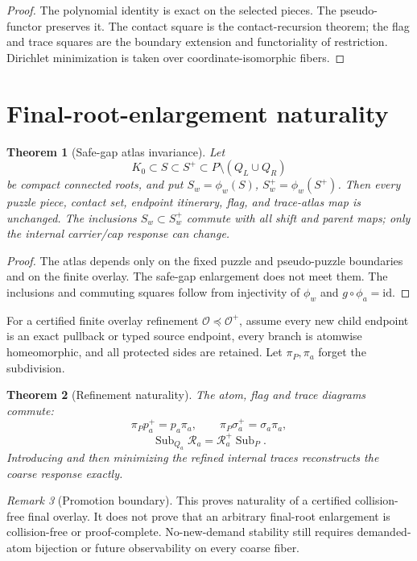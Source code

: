 \documentclass[11pt]{article}
\newtheorem{theorem}{Theorem}[section]
\theoremstyle{definition}
\theoremstyle{remark}
\newtheorem{remark}[theorem]{Remark}
\begin{document}
\begin{proof}
The polynomial identity is exact on the selected pieces.  The pseudo-functor
preserves it.  The contact square is the contact-recursion theorem; the flag
and trace squares are the boundary extension and functoriality of restriction.
Dirichlet minimization is taken over coordinate-isomorphic fibers.
\end{proof}

\section{Final-root-enlargement naturality}
\begin{theorem}[Safe-gap atlas invariance]
Let
\[
 K_0\subset S\subset S^+\subset P\setminus(Q_L\cup Q_R)
\]
be compact connected roots, and put $S_w=\phi_w(S)$,
$S_w^+=\phi_w(S^+)$.  Then every puzzle piece, contact set, endpoint itinerary,
flag, and trace-atlas map is unchanged.  The inclusions $S_w\subset S_w^+$
commute with all shift and parent maps; only the internal carrier/cap response
can change.
\end{theorem}

\begin{proof}
The atlas depends only on the fixed puzzle and pseudo-puzzle boundaries and on
the finite overlay.  The safe-gap enlargement does not meet them.  The
inclusions and commuting squares follow from injectivity of $\phi_w$ and
$g\circ\phi_a=\mathrm{id}$.
\end{proof}

For a certified finite overlay refinement
$\mathscr O\preceq\mathscr O^+$, assume every new child endpoint is an exact
pullback or typed source endpoint, every branch is atomwise homeomorphic, and
all protected sides are retained.  Let $\pi_P,\pi_a$ forget the subdivision.

\begin{theorem}[Refinement naturality]
The atom, flag and trace diagrams commute:
\[
 \pi_Pp_a^+=p_a\pi_a,
 \qquad
 \pi_P\sigma_a^+=\sigma_a\pi_a,
\]
\[
 \boxed{\operatorname{Sub}_{Q_a}\mathcal R_a
 =\mathcal R_a^+\operatorname{Sub}_P.}
\]
Introducing and then minimizing the refined internal traces reconstructs the
coarse response exactly.
\end{theorem}

\begin{remark}[Promotion boundary]
This proves naturality of a certified collision-free final overlay.  It does
not prove that an arbitrary final-root enlargement is collision-free or
proof-complete.  No-new-demand stability still requires demanded-atom
bijection or future observability on every coarse fiber.
\end{remark}
\end{document}
